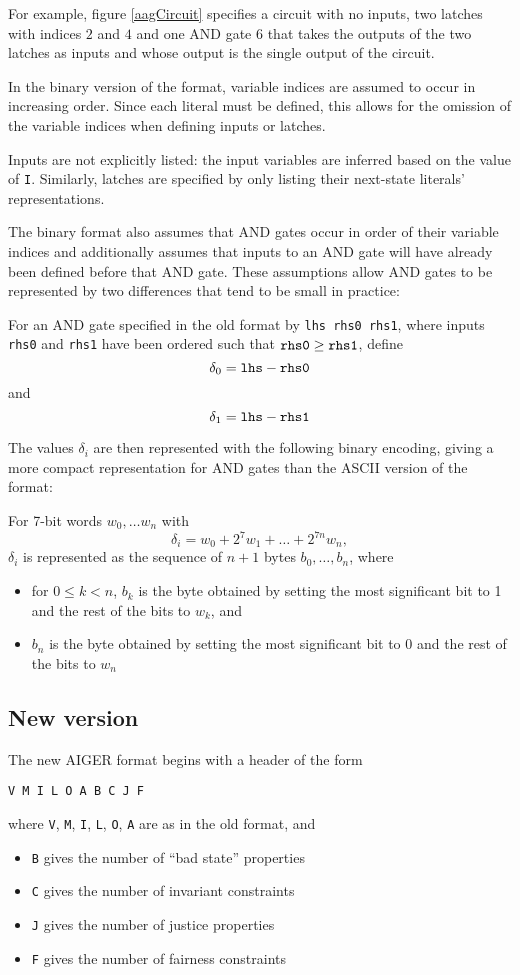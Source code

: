 \documentclass[12pt,a4paper,twoside,openright]{report}
\begin{document}
For example, figure \ref{aagCircuit} specifies a circuit with
no inputs, two latches with indices $2$ and $4$ and one AND gate
$6$ that takes the outputs of the two latches as inputs and whose
output is the single output of the circuit.

In the binary version of the format, variable indices are assumed to
occur in increasing order. Since each literal must be defined, this allows
for the omission of the variable indices when defining inputs or latches.

Inputs are not explicitly listed: the input variables are inferred based on
the value of \verb,I,.
Similarly, latches are specified by only listing their next-state literals'
representations.

The binary format also assumes that AND gates occur in order of their
variable indices and additionally assumes that inputs to an AND gate will
have already been defined before that AND gate.
These assumptions allow AND gates to be represented by two differences
that tend to be small in practice:

For an AND gate specified in the old format by \verb,lhs rhs0 rhs1,,
where inputs \verb,rhs0, and \verb,rhs1, have been ordered such that
$\verb,rhs0, \geq \verb,rhs1,$, define
$$\delta_0 = \verb,lhs, - \verb,rhs0,$$
and
$$\delta_1 = \verb,lhs, - \verb,rhs1,$$

The values $\delta_i$ are then represented with the following binary
encoding, giving a more compact representation for AND gates than
the ASCII version of the format:

For 7-bit words $w_0, \ldots w_n$ with
$$\delta_i = w_0 + 2^7w_1 + \ldots + 2^{7n}w_n,$$
$\delta_i$ is represented as the sequence of $n + 1$ bytes
$b_0, \ldots, b_n$, where
\begin{itemize}
\item for $0 \leq k < n$, $b_k$ is the byte obtained by setting the most
significant bit to 1 and the rest of the bits to $w_k$, and
\item $b_n$ is the byte obtained by setting the most
significant bit to 0 and the rest of the bits to $w_n$
\end{itemize}


\subsection{New version}

The new AIGER format begins with a header of the form
\begin{verbatim}
V M I L O A B C J F
\end{verbatim}
where \verb,V,, \verb,M,, \verb,I,, \verb,L,, \verb,O,, \verb,A, are as
in the old format, and
\begin{itemize}
\item \verb,B, gives the number of ``bad state'' properties
\item \verb,C, gives the number of invariant constraints
\item \verb,J, gives the number of justice properties
\item \verb,F, gives the number of fairness constraints
\end{itemize}
\end{document}
